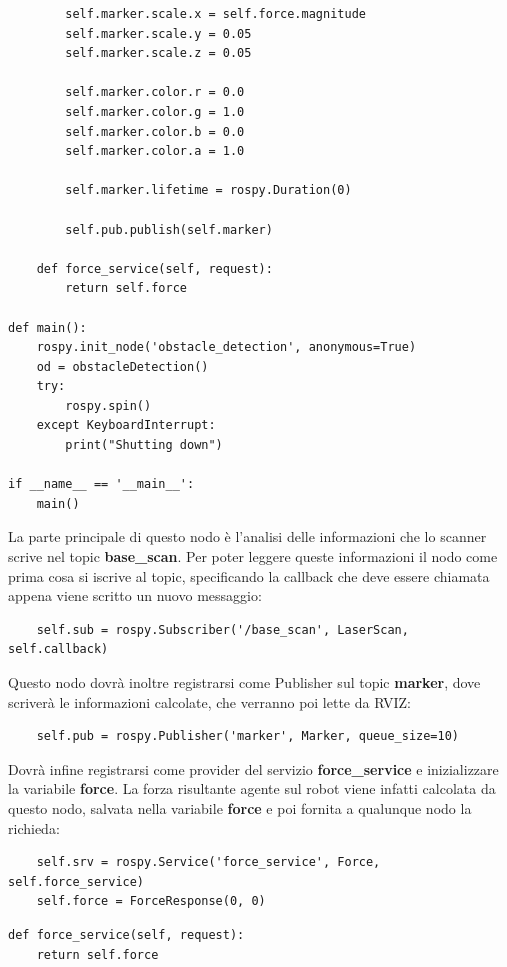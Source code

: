 \documentclass[Lau, binding=0.6cm, oneside]{sapthesis}
\begin{document}
\begin{lstlisting}
        self.marker.scale.x = self.force.magnitude
        self.marker.scale.y = 0.05
        self.marker.scale.z = 0.05

        self.marker.color.r = 0.0
        self.marker.color.g = 1.0
        self.marker.color.b = 0.0
        self.marker.color.a = 1.0

        self.marker.lifetime = rospy.Duration(0)

        self.pub.publish(self.marker)

    def force_service(self, request):
        return self.force

def main():
    rospy.init_node('obstacle_detection', anonymous=True)
    od = obstacleDetection()
    try:
        rospy.spin()
    except KeyboardInterrupt:
        print("Shutting down")

if __name__ == '__main__':
    main()
\end{lstlisting}

La parte principale di questo nodo è l'analisi delle informazioni che lo scanner scrive nel topic \textbf{base\_scan}.
Per poter leggere queste informazioni il nodo come prima cosa si iscrive al topic, specificando la callback che deve essere chiamata appena viene scritto un nuovo messaggio:

\begin{lstlisting}
    self.sub = rospy.Subscriber('/base_scan', LaserScan, self.callback)
\end{lstlisting}

Questo nodo dovrà inoltre registrarsi come Publisher sul topic \textbf{marker}, dove scriverà le informazioni calcolate, che verranno poi lette da RVIZ:

\begin{lstlisting}
    self.pub = rospy.Publisher('marker', Marker, queue_size=10)
\end{lstlisting}

Dovrà infine registrarsi come provider del servizio \textbf{force\_service} e inizializzare la variabile \textbf{force}.
La forza risultante agente sul robot viene infatti calcolata da questo nodo, salvata nella variabile \textbf{force} e poi fornita a qualunque nodo la richieda:

\begin{lstlisting}
    self.srv = rospy.Service('force_service', Force, self.force_service)
    self.force = ForceResponse(0, 0)
\end{lstlisting}

\begin{lstlisting}
def force_service(self, request):
    return self.force
\end{lstlisting}
\end{document}
